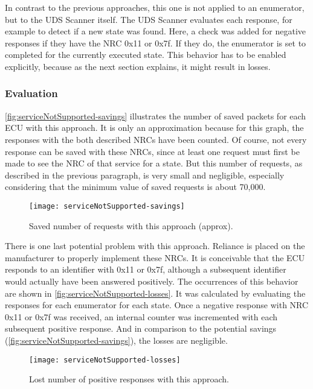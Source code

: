 In contrast to the previous approaches, this one is not applied to an enumerator, but to the UDS Scanner itself. The UDS Scanner evaluates each response, for example to detect if a new state was found. Here, a check was added for negative responses if they have the NRC 0x11 or 0x7f. If they do, the enumerator is set to completed for the currently executed state. This behavior has to be enabled explicitly, because as the next section explains, it might result in losses.

\subsubsection{Evaluation}

\autoref{fig:serviceNotSupported-savings} illustrates the number of saved packets for each ECU with this approach. It is only an approximation because for this graph, the responses with the both described NRCs have been counted. Of course, not every response can be saved with these NRCs, since at least one request must first be made to see the NRC of that service for a state. But this number of requests, as described in the previous paragraph, is very small and negligible, especially considering that the minimum value of saved requests is about 70,000.

\begin{figure}[h]
    \centering
    \texttt{[image: serviceNotSupported-savings]}
    \caption{Saved number of requests with this approach (approx).}
    \label{fig:serviceNotSupported-savings}
\end{figure}

There is one last potential problem with this approach. Reliance is placed on the manufacturer to properly implement these NRCs. It is conceivable that the ECU responds to an identifier with 0x11 or 0x7f, although a subsequent identifier would actually have been answered positively. The occurrences of this behavior are shown in \autoref{fig:serviceNotSupported-losses}. It was calculated by evaluating the responses for each enumerator for each state. Once a negative response with NRC 0x11 or 0x7f was received, an internal counter was incremented with each subsequent positive response.
And in comparison to the potential savings (\autoref{fig:serviceNotSupported-savings}), the losses are negligible.

\begin{figure}[H]
    \centering
    \texttt{[image: serviceNotSupported-losses]}
    \caption{Lost number of positive responses with this approach.}
    \label{fig:serviceNotSupported-losses}
\end{figure}

